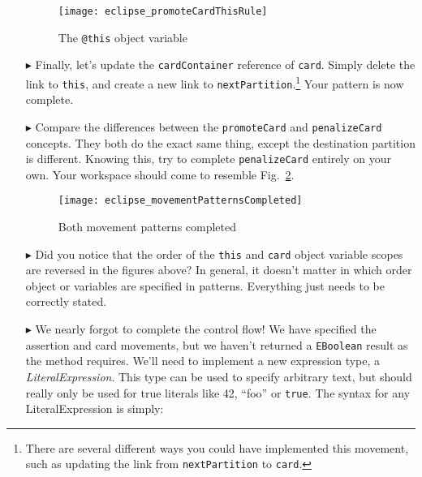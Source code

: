 \begin{itemize}
\begin{figure}[htbp]
\begin{center}
  \texttt{[image: eclipse\_promoteCardThisRule]}
  \caption{The \texttt{@this} object variable}
  \label{fig:promoteThisRule}
\end{center}
\end{figure} 

\item[$\blacktriangleright$] Finally, let's update the \texttt{cardContainer} reference of \texttt{card}. Simply delete the link to \texttt{this}, and create
a new link to \texttt{nextPartition}.\footnote{There are several different ways you could have implemented this movement, such as updating the link from
\texttt{nextPartition} to \texttt{card}.} Your pattern is now complete.

\vspace{0.5cm}

\item[$\blacktriangleright$] Compare the differences between the \texttt{promoteCard} and \texttt{penalizeCard} concepts. They both do the exact same thing,
except the destination partition is different. Knowing this, try to complete \texttt{penalizeCard} entirely on your own. Your workspace should come to
resemble Fig.~\ref{fig:completedPatterns}.

\newpage

\begin{figure}[htbp]
\begin{center}
  \texttt{[image: eclipse\_movementPatternsCompleted]}
  \caption{Both movement patterns completed}
  \label{fig:completedPatterns}
\end{center}
\end{figure}

\item[$\blacktriangleright$] Did you notice that the order of the \texttt{this} and \texttt{card} object variable scopes are reversed in the figures above?
In general, it doesn't matter in which order object or variables are specified in patterns. Everything just needs to be correctly stated. 

\item[$\blacktriangleright$] We nearly forgot to complete the control flow! We have specified the assertion and card movements, but we haven't returned a
\texttt{EBoolean} result as the method requires.  We'll need to implement a new expression type, a \emph{LiteralExpression}. This
type can be used to specify arbitrary text, but should really only be used for true literals like 42, ``foo'' or \texttt{true}. The syntax for any LiteralExpression
is simply:


\end{itemize}
